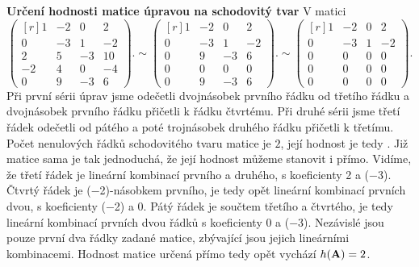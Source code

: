 \wikitextrule
\begin{example}\label{MAI:exam083} 
  \textbf{Určení hodnosti matice úpravou na schodovitý tvar}\newline\small
  V matici
  \begin{equation*}
    \begin{pmatrix*}[r]
        1 & -2 &  0 &  2  \\
        0 & -3 &  1 & -2  \\
        2 &  5 & -3 & 10  \\
       -2 &  4 &  0 & -4  \\
        0 &  9 & -3 &  6
    \end{pmatrix*}. \sim
    \begin{pmatrix*}[r]
        1 & -2 &  0 &  2  \\
        0 & -3 &  1 & -2  \\
        0 &  9 & -3 &  6  \\
        0 &  0 &  0 &  0  \\
        0 &  9 & -3 &  6
    \end{pmatrix*}. \sim
    \begin{pmatrix*}[r]
        1 & -2 &  0 &  2  \\
        0 & -3 &  1 & -2  \\
        0 &  0 &  0 &  0  \\
        0 &  0 &  0 &  0  \\
        0 &  0 &  0 &  0
    \end{pmatrix*}.
  \end{equation*}
  Při první sérii úprav jsme odečetli dvojnásobek prvního řádku od třetího řádku a dvojnásobek 
  prvního řádku přičetli k řádku čtvrtému. Při druhé sérii jsme třetí řádek odečetli od pátého a 
  poté trojnásobek druhého řádku přičetli k třetímu. Počet nenulových řádků schodovitého tvaru 
  matice je \(\num{2}\), její hodnost je tedy . Již matice sama je tak jednoduchá, že její hodnost 
  můžeme stanovit i přímo. Vidíme, že třetí řádek je lineární kombinací prvního a druhého, s 
  koeficienty \num{2} a (\num{-3}). Čtvrtý řádek je (\num{-2})-násobkem prvního, je tedy opět 
  lineární kombinací prvních dvou, s koeficienty (\num{-2}) a \num{0}. Pátý řádek je součtem 
  třetího a čtvrtého, je tedy lineární kombinací prvních dvou řádků s koeficienty \num{0} a 
  (\num{-3}). Nezávislé jsou pouze první dva řádky zadané matice, zbývající jsou jejich lineárními 
  kombinacemi. Hodnost matice určená přímo tedy opět vychází \(h(\mathbf{A}) = 2\).
  \normalsize
\end{example}